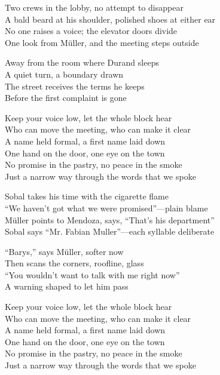 \begin{lyrics}
Two crews in the lobby, no attempt to disappear\\
A bald beard at his shoulder, polished shoes at either ear\\
No one raises a voice; the elevator doors divide\\
One look from Müller, and the meeting steps outside

Away from the room where Durand sleeps\\
A quiet turn, a boundary drawn\\
The street receives the terms he keeps\\
Before the first complaint is gone

Keep your voice low, let the whole block hear\\
Who can move the meeting, who can make it clear\\
A name held formal, a first name laid down\\
One hand on the door, one eye on the town\\
No promise in the pastry, no peace in the smoke\\
Just a narrow way through the words that we spoke

Sobal takes his time with the cigarette flame\\
“We haven’t got what we were promised”—plain blame\\
Müller points to Mendoza, says, “That’s his department”\\
Sobal says “Mr. Fabian Muller”—each syllable deliberate

“Barys,” says Müller, softer now\\
Then scans the corners, roofline, glass\\
“You wouldn’t want to talk with me right now”\\
A warning shaped to let him pass

Keep your voice low, let the whole block hear\\
Who can move the meeting, who can make it clear\\
A name held formal, a first name laid down\\
One hand on the door, one eye on the town\\
No promise in the pastry, no peace in the smoke\\
Just a narrow way through the words that we spoke


\end{lyrics}
